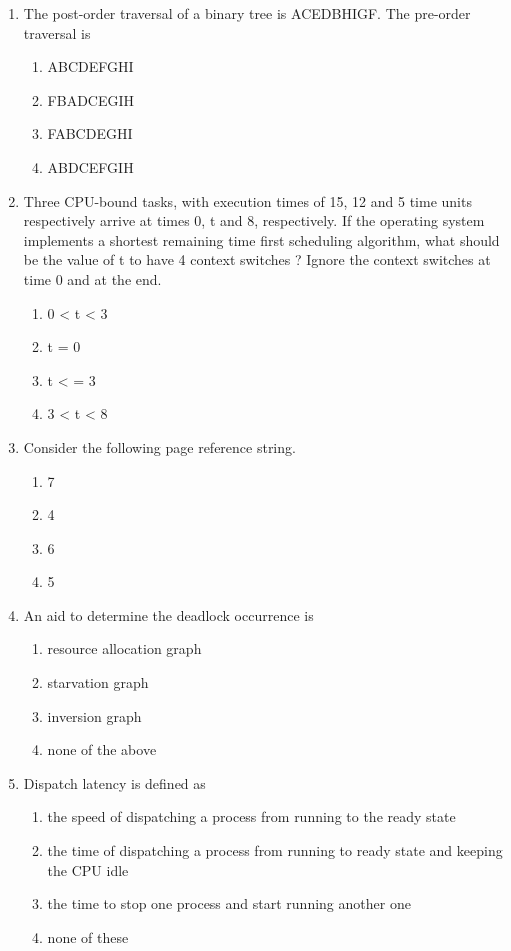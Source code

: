 \documentclass[12pt]{article}
\begin{document}
\begin{enumerate}
\item[16.] The post-order traversal of a binary tree is ACEDBHIGF. The pre-order traversal is
\begin{enumerate}[label=\Alph*.]
  \item ABCDEFGHI
  \item FBADCEGIH
  \item FABCDEGHI
  \item ABDCEFGIH
\end{enumerate}

\item[17.] Three CPU-bound tasks, with execution times of 15, 12 and 5 time units respectively arrive at times 0, t and 8, respectively. If the operating system implements a shortest remaining time first scheduling algorithm, what should be the value of t to have 4 context switches ? Ignore the context switches at time 0 and at the end.
\begin{enumerate}[label=\Alph*.]
  \item 0 \textless{} t \textless{} 3
  \item t = 0
  \item t \textless{} = 3
  \item 3 \textless{} t \textless{} 8
\end{enumerate}

\item[18.] Consider the following page reference string.
\begin{enumerate}[label=\Alph*.]
  \item 7
  \item 4
  \item 6
  \item 5
\end{enumerate}

\item[19.] An aid to determine the deadlock occurrence is
\begin{enumerate}[label=\Alph*.]
  \item resource allocation graph
  \item starvation graph
  \item inversion graph
  \item none of the above
\end{enumerate}

\item[20.] Dispatch latency is defined as
\begin{enumerate}[label=\Alph*.]
  \item the speed of dispatching a process from running to the ready state
  \item the time of dispatching a process from running to ready state and keeping the CPU idle
  \item the time to stop one process and start running another one
  \item none of these
\end{enumerate}


\end{enumerate}
\end{document}
